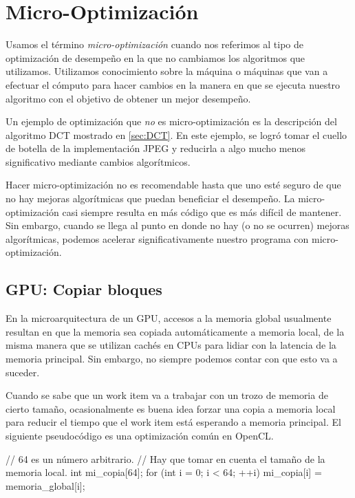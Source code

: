 {%
\section{Micro-Optimización} \label{sec:microopt}


Usamos el término \emph{micro-optimización} cuando nos referimos al tipo de
optimización de desempeño en la que no cambiamos los algoritmos que utilizamos.
Utilizamos conocimiento sobre la máquina o máquinas que van a
efectuar el cómputo para hacer cambios en la manera en que se ejecuta nuestro
algoritmo con el objetivo de obtener un mejor desempeño.

Un ejemplo de optimización que \emph{no} es micro-optimización es la
descripción del algoritmo DCT mostrado en \ref{sec:DCT}. En este ejemplo, se
logró tomar el cuello de botella de la implementación JPEG y reducirla a algo
mucho menos significativo mediante cambios algorítmicos.

Hacer micro-optimización no es recomendable hasta que uno esté seguro de que no
hay mejoras algorítmicas que puedan beneficiar el desempeño. La
micro-optimización casi siempre resulta en más código que es más difícil de
mantener. Sin embargo, cuando se llega al punto en donde no hay (o no se
ocurren) mejoras algorítmicas, podemos acelerar significativamente nuestro
programa con micro-optimización.

\subsection{GPU: Copiar bloques}

En la microarquitectura de un GPU, accesos a la memoria global usualmente
resultan en que la memoria sea copiada automáticamente a memoria local, de la
misma manera que se utilizan cachés en CPUs para lidiar con la latencia de la
memoria principal. Sin embargo, no siempre podemos contar con que esto va a
suceder.

Cuando se sabe que un work item va a trabajar con un trozo de memoria de cierto
tamaño, ocasionalmente es buena idea forzar una copia a memoria local para
reducir el tiempo que el work item está esperando a memoria principal. El
siguiente pseudocódigo es una optimización común en OpenCL.

\label{alg:gpgpu-memcpy}
\begin{code}[language=C][h]
    // 64 es un número arbitrario.
    // Hay que tomar en cuenta el tamaño de la memoria local.
    int mi_copia[64];
    for (int i = 0; i < 64; ++i) {
        mi_copia[i] = memoria_global[i];
    }
\end{code}

}
